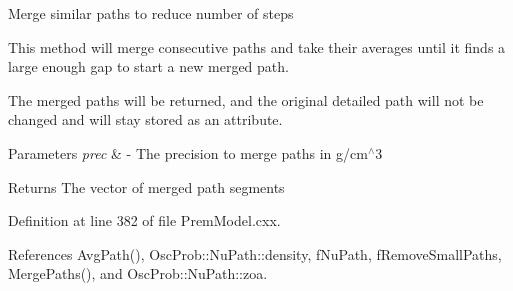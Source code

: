 Merge similar paths to reduce number of steps

This method will merge consecutive paths and take their averages until it finds a large enough gap to start a new merged path.

The merged paths will be returned, and the original detailed path will not be changed and will stay stored as an attribute.


\begin{DoxyParams}{Parameters}
{\em prec} & -\/ The precision to merge paths in g/cm$^\wedge$3 \\
\hline
\end{DoxyParams}
\begin{DoxyReturn}{Returns}
The vector of merged path segments 
\end{DoxyReturn}


Definition at line 382 of file Prem\+Model.\+cxx.



References Avg\+Path(), Osc\+Prob\+::\+Nu\+Path\+::density, f\+Nu\+Path, f\+Remove\+Small\+Paths, Merge\+Paths(), and Osc\+Prob\+::\+Nu\+Path\+::zoa.


